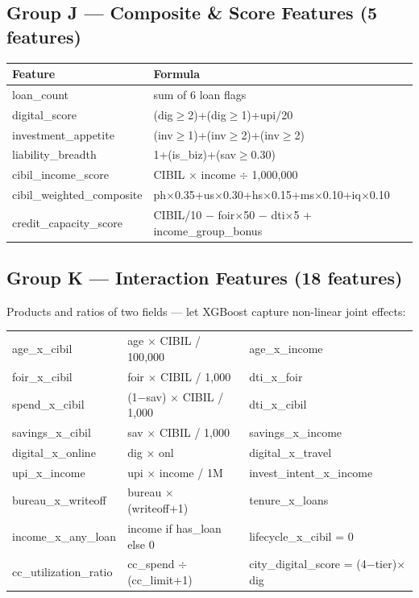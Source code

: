 \documentclass[12pt,a4paper]{article}
\begin{document}
\subsection{Group J — Composite \& Score Features (5 features)}

\begin{tabular}{ll}
\toprule
\textbf{Feature} & \textbf{Formula} \\
\midrule
loan\_count             & sum of 6 loan flags \\
digital\_score          & (dig$\geq$2)+(dig$\geq$1)+upi/20 \\
investment\_appetite    & (inv$\geq$1)+(inv$\geq$2)+(inv$\geq$2) \\
liability\_breadth      & 1+(is\_biz)+(sav$\geq$0.30) \\
cibil\_income\_score    & CIBIL $\times$ income $\div$ 1{,}000{,}000 \\
cibil\_weighted\_composite & ph$\times$0.35+us$\times$0.30+hs$\times$0.15+ms$\times$0.10+iq$\times$0.10 \\
credit\_capacity\_score & CIBIL/10 $-$ foir$\times$50 $-$ dti$\times$5 + income\_group\_bonus \\
\bottomrule
\end{tabular}

\subsection{Group K — Interaction Features (18 features)}

Products and ratios of two fields — let XGBoost capture non-linear joint effects:

\begin{tabular}{lll}
\toprule
age\_x\_cibil           & age $\times$ CIBIL / 100{,}000      & age\_x\_income          \\
foir\_x\_cibil          & foir $\times$ CIBIL / 1{,}000       & dti\_x\_foir            \\
spend\_x\_cibil         & (1$-$sav) $\times$ CIBIL / 1{,}000  & dti\_x\_cibil           \\
savings\_x\_cibil       & sav $\times$ CIBIL / 1{,}000        & savings\_x\_income      \\
digital\_x\_online      & dig $\times$ onl                    & digital\_x\_travel      \\
upi\_x\_income          & upi $\times$ income / 1M            & invest\_intent\_x\_income \\
bureau\_x\_writeoff     & bureau $\times$ (writeoff+1)        & tenure\_x\_loans        \\
income\_x\_any\_loan    & income if has\_loan else 0          & lifecycle\_x\_cibil = 0 \\
cc\_utilization\_ratio  & cc\_spend $\div$ (cc\_limit+1)      & city\_digital\_score = (4$-$tier)$\times$dig \\
\bottomrule
\end{tabular}
\end{document}
